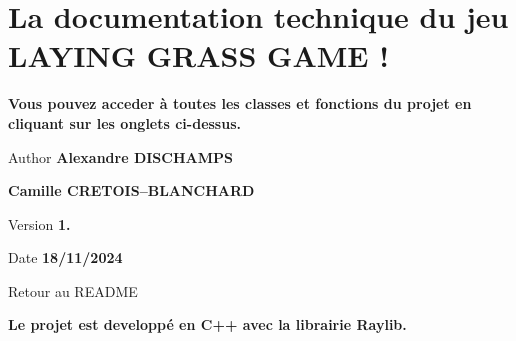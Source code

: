 \chapter{La documentation technique du jeu LAYING GRASS GAME !}
\hypertarget{index}{}\label{index}
{\bfseries{Vous pouvez acceder à toutes les classes et fonctions du projet en cliquant sur les onglets ci-\/dessus.}} \begin{DoxyAuthor}{Author}
{\bfseries{Alexandre DISCHAMPS}} 

{\bfseries{Camille CRETOIS--BLANCHARD}} 
\end{DoxyAuthor}
\begin{DoxyVersion}{Version}
{\bfseries{1.}} 
\end{DoxyVersion}
\begin{DoxyDate}{Date}
{\bfseries{18/11/2024}}
\end{DoxyDate}
Retour au README

{\bfseries{Le projet est developpé en C++ avec la librairie Raylib.}} 